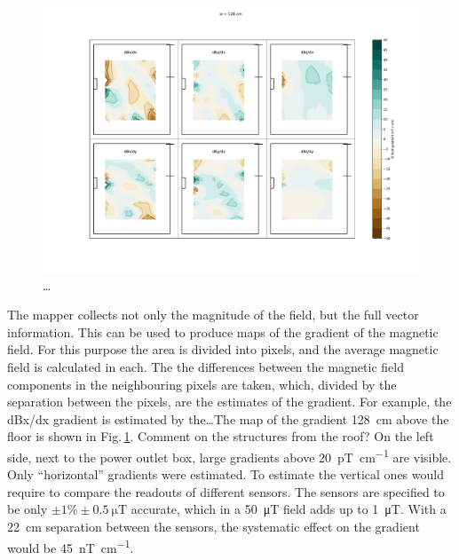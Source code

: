 \begin{figure}
  \centering
  \includegraphics[width=\linewidth]{gfx/mapping/lpsc/bastille_crane_away_rep_gradient_139cm.pdf}
  \caption{\ldots}
  \label{fig:mapping_bastille_gradient}
\end{figure}

The mapper collects not only the magnitude of the field, but the full vector information. This can be used to produce maps of the gradient of the magnetic field. For this purpose the area is divided into pixels, and the average magnetic field is calculated in each.
The the differences between the magnetic field components in the neighbouring pixels are taken, which, divided by the separation between the pixels, are the estimates of the gradient.
For example, the dBx/dx gradient is estimated by the\ldots The map of the gradient \SI{128}{\centi\meter} above the floor is shown in Fig.\,\ref{fig:mapping_bastille_gradient}. Comment on the structures from the roof? On the left side, next to the power outlet box, large gradients above \SI[per-mode=symbol]{20}{\pico\tesla\per\centi\meter} are visible. Only ``horizontal'' gradients were estimated.
To estimate the vertical ones would require to compare the readouts of different sensors. The sensors are specified to be only $\pm 1\% \pm \SI{0.5}{\micro\tesla}$ accurate, which in a \SI{50}{\micro\tesla} field adds up to \SI{1}{\micro\tesla}. With a \SI{22}{\centi\meter} separation between the sensors, the systematic effect on the gradient would be \SI[per-mode=symbol]{45}{\nano\tesla\per\centi\meter}.

